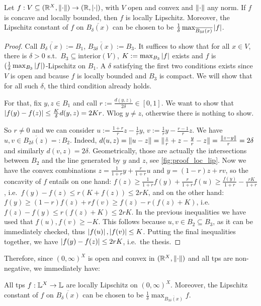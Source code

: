 \begin{theorem}\label{th:locLip}
Let $f:V\subseteq (\mathbb{R}^X,\lVert\cdot\rVert) \to (\mathbb{R},\left\lvert\cdot\right\rvert)$, with $V$ open and convex and $\lVert\cdot\rVert$ any norm.
If $f$ is concave and locally bounded, then $f$ is locally Lipschitz.
Moreover, the Lipschitz constant of $f$ on $\overline{B_{\delta}(x)}$ can be chosen to be $\frac{1}{\delta}\max_{\overline{B_{3\delta}(x)}} \left\lvert f\right\rvert$.
\end{theorem}
\begin{proof}
 Call $\overline{B_{\delta}(x)}:=B_1$, $\overline{B_{3\delta}(x)}:=B_3$.
 It suffices to show that for all $x\in V$, there is $\delta>0$ s.t.\ $B_3\subseteq \mathrm{interior}(V)$, $K:=\max_{B_3}  \left\lvert f\right\rvert$ exists and $f$ is $(\frac{1}{\delta}\max_{B_3} \left\lvert f\right\rvert)$-Lipschitz on $B_1$.
 A $\delta$ satisfying the first two conditions exists since $V$ is open and bcause $f$ is locally bounded and $B_3$ is compact.
 We will show that for all such $\delta$, the third condition already holds.

 For that, fix $y,z\in B_1$ and call $r:=\frac{d(y,z)}{2\delta}\in[0,1]$.
 We want to show that $\left\lvert f(y)-f(z)\right\rvert\leq \frac{K}{\delta}d(y,z)=2Kr$.
 Wlog $y\neq z$, otherwise there is nothing to show.

 So $r\neq 0$ and we can consider $u:=\frac{1+r}{r}z-\frac{1}{r}y$, $v:=\frac{1}{r}y-\frac{r-1}{r}z$.
 We have $u,v\in \overline{B_{2\delta}(z)}=:B_2$.
 Indeed, $d(u,z)=\lVert u-z\rVert=\lVert\frac{z}{r}+z-\frac{y}{r}-z\rVert=\frac{\lVert z-y\rVert}{r}=2\delta$ and similarly $d(v,z)=2\delta$.
 Geometrically, those are actually the intersections between $B_2$ and the line generated by $y$ and $z$, see \autoref{fig:proof_loc_lip}.
 Now we have the convex combinations $z=\frac{1}{1+r}y+\frac{r}{1+r}u$ and $y=(1-r)z+rv$, so the concavity of $f$ entails on one hand:
 $f(z)\geq \frac{1}{1+r}f(y)+\frac{r}{1+r}f(u)\geq \frac{f(y)}{1+r} - \frac{rK}{1+r}$, i.e.\ $f(y)-f(z)\leq r(K+f(z))\leq 2rK$, and on the other hand:
 $f(y)\geq (1-r)f(z)+rf(v)\geq f(z)-r(f(z)+K)$, i.e.\ $f(z)-f(y)\leq r(f(z)+K)\leq 2rK$.
 In the previous inequalities we have used that $f(u),f(v)\geq -K$.
 This follows because $u,v\in B_2\subseteq B_3$, as it can be immediately checked, thus $\left\lvert f(u)\right\rvert,\left\lvert f(v)\right\rvert\leq K$.
 Putting the final inequalities together, we have $\left\lvert f(y)-f(z)\right\rvert\leq 2rK$, i.e.\ the thesis.
\end{proof}

Therefore, since $(0,\infty)^X$ is open and convex in $(\mathbb{R}^X,\lVert\cdot\rVert)$ and all tps are non-negative, we immediately have:

\begin{theorem}
All tps $f:\mathbb{L}^X\to\mathbb{L}$ are locally Lipschitz on $(0,\infty)^X$.
Moreover, the Lipschitz constant of $f$ on $\overline{B_{\delta}(x)}$ can be chosen to be $\frac{1}{\delta}\max_{\overline{B_{3\delta}(x)}} f$.
\end{theorem}
